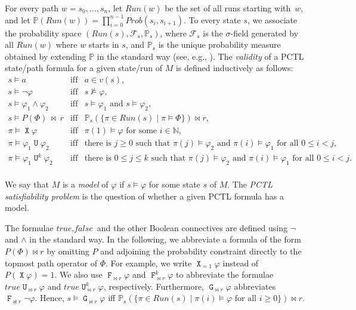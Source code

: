 \documentclass[a4paper,UKenglish,cleveref, autoref, thm-restate]{lipics-v2021}
\newcommand{\N}{\mathbb{N}}
\newcommand{\F}{\mathcal{F}}
\newcommand{\run}{\textit{Run}}
\newcommand{\Prob}{\mathit{Prob}}
\newcommand*{\vp}{\varphi}
\newcommand*{\opx}{\operatorname{\pmb{\mathtt{X}}}}
\newcommand*{\opu}{\operatorname{\pmb{\mathtt{U}}}}
\newcommand*{\opf}{\operatorname{\pmb{\mathtt{F}}}}
\newcommand*{\opg}{\operatorname{\pmb{\mathtt{G}}}}
\newcommand*{\m}{\mathbb{P}}
\begin{document}
For every path $w = s_0, \ldots ,s_n$, let $\run(w)$ be the set of all runs starting with~$w$, and let $\m(\run(w)) = \prod_{i=0}^{n-1} \Prob(s_i,s_{i+1})$. To every state $s$, we associate the probability space $(\run(s),\F_{s},\m_{s})$, where $\F_{s}$ is the \mbox{$\sigma$-field} generated by all $\run(w)$ where $w$ starts in $s$, and $\m_{s}$ is the unique probability measure obtained by extending $\m$ in the standard way (see, e.g., \cite{Billingsley:book}). 
The \emph{validity} of a PCTL state/path formula for a given state/run of $M$ is defined inductively as follows:
\[
\begin{array}{lcl}
  s \models a & \mbox{iff} & a \in v(s),\\
  s \models \neg\varphi & \mbox{iff} & s \not\models \varphi,\\
  s \models \vp_1 \wedge \vp_2 &  \mbox{iff} & s \models \vp_1 \mbox{ and } s \models \vp_2,\\
  s \models P(\Phi) \,{\bowtie}\, r  &  \mbox{iff} &  \m_{s}(\{ \pi \in \run(s) \mid \pi \models \Phi \}) \bowtie r,\\[1ex]
  \pi \models \opx \vp  &  \mbox{iff} & \pi(1) \models \vp \mbox{ for some } i \in \N,\\
\pi \models \vp_1 \opu \varphi_2 &  \mbox{iff} & \mbox{there is } j\geq 0 \mbox{ such that }
\pi(j) \models \vp_2
  \mbox{ and }
    \pi(i) \models \vp_1 \mbox{ for all } 0\leq i < j,\\
  \pi \models \vp_1 \opu^k \varphi_2 &  \mbox{iff} & \mbox{there is } 0 \leq j\leq k \mbox{ such that } \pi(j) \models \vp_2
     \mbox{ and }
   \pi(i) \models \vp_1 \mbox{ for all } 0\leq i < j.\\
\end{array} 
\]

We say that $M$ is a \emph{model} of $\varphi$ if $s \models \varphi$ for some state $s$ of $M$. The \emph{PCTL satisfiability problem} is the question of whether a given PCTL formula has a model.

The formulae $\textit{true},\textit{false}$ and the other Boolean connectives are defined using $\neg$ and $\wedge$ in the standard way. In the following, we abbreviate a formula of the form $P(\Phi) \bowtie r$ by omitting $P$ and adjoining the probability constraint directly to the topmost path operator of $\Phi$. For example, we write $\opx_{{=}1} \varphi$ instead of $P(\opx\varphi) = 1$. 
We also use $\opf_{\bowtie r} \vp$ and $\opf_{\bowtie r}^k \vp$ to abbreviate the formulae $\textit{true} \opu_{\bowtie r} \vp$ and $\textit{true} \opu^k_{\bowtie r} \vp$, respectively. Furthermore, $\opg_{\bowtie r} \vp$ abbreviates $\opf_{\not\bowtie r} \neg \vp$. Hence, $s \models \opg_{\bowtie r} \varphi$ iff 
$\m_{s}(\{ \pi \in \run(s) \mid \pi(i) \models \varphi \mbox{ for all } i \geq 0\}) \bowtie r$.
\smallskip
\end{document}

